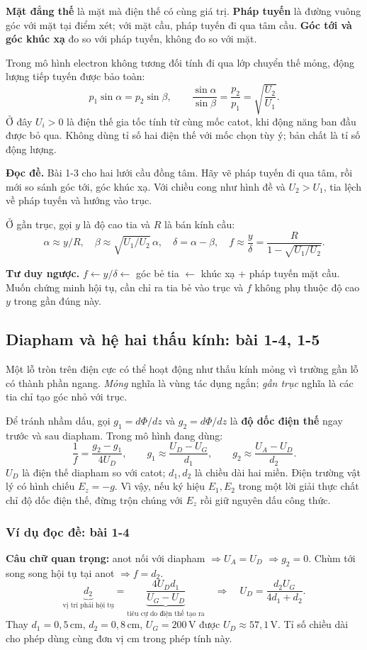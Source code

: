 \documentclass[11pt,a4paper]{article}
\newcommand{\unit}[1]{\,\mathrm{#1}}
\newcommand{\readit}[1]{\par\textbf{Đọc đề.} #1\par}
\newcommand{\think}[1]{\par\textbf{Tư duy ngược.} #1\par}
\newcommand{\ex}[1]{\subsubsection*{Ví dụ đọc đề: #1}}
\begin{document}
\textbf{Mặt đẳng thế} là mặt mà điện thế có cùng giá trị.
\textbf{Pháp tuyến} là đường vuông góc với mặt tại điểm xét;
với mặt cầu, pháp tuyến đi qua tâm cầu.
\textbf{Góc tới và góc khúc xạ} đo so với pháp tuyến, không đo so với mặt.

Trong mô hình electron không tương đối tính đi qua lớp chuyển thế mỏng,
động lượng tiếp tuyến được bảo toàn:
\[
p_1\sin\alpha=p_2\sin\beta,\qquad
\frac{\sin\alpha}{\sin\beta}=\frac{p_2}{p_1}
=\sqrt{\frac{U_2}{U_1}}.
\]
Ở đây $U_i>0$ là điện thế gia tốc tính từ cùng mốc catot,
khi động năng ban đầu được bỏ qua. Không dùng tỉ số hai điện thế
với mốc chọn tùy ý; bản chất là tỉ số động lượng.

\readit{Bài 1-3 cho hai lưới cầu đồng tâm. Hãy vẽ pháp tuyến đi qua tâm,
rồi mới so sánh góc tới, góc khúc xạ. Với chiều cong như hình đề và
$U_2>U_1$, tia lệch về pháp tuyến và hướng vào trục.}
Ở gần trục, gọi $y$ là độ cao tia và $R$ là bán kính cầu:
\[
\alpha\approx y/R,\quad
\beta\approx\sqrt{U_1/U_2}\,\alpha,\quad
\delta=\alpha-\beta,\quad
f\approx\frac y\delta=\frac R{1-\sqrt{U_1/U_2}}.
\]
\think{$f\leftarrow y/\delta\leftarrow$ góc bẻ tia
$\leftarrow$ khúc xạ + pháp tuyến mặt cầu. Muốn chứng minh hội tụ,
cần chỉ ra tia bẻ vào trục và $f$ không phụ thuộc độ cao $y$ trong gần đúng này.}

\subsection{Diapham và hệ hai thấu kính: bài 1-4, 1-5}\label{sec:diaphragm}
Một lỗ tròn trên điện cực có thể hoạt động như thấu kính mỏng vì trường
gần lỗ có thành phần ngang. \emph{Mỏng} nghĩa là vùng tác dụng ngắn;
\emph{gần trục} nghĩa là các tia chỉ tạo góc nhỏ với trục.

Để tránh nhầm dấu, gọi $g_1=d\Phi/dz$ và $g_2=d\Phi/dz$ là
\textbf{độ dốc điện thế} ngay trước và sau diapham. Trong mô hình đang dùng:
\[
\frac1f=\frac{g_2-g_1}{4U_D},\qquad
g_1\approx\frac{U_D-U_G}{d_1},\qquad
g_2\approx\frac{U_A-U_D}{d_2}.
\]
$U_D$ là điện thế diapham so với catot; $d_1,d_2$ là chiều dài hai miền.
Điện trường vật lý có hình chiếu $E_z=-g$. Vì vậy, nếu ký hiệu $E_1,E_2$
trong một lời giải thực chất chỉ độ dốc điện thế, đừng trộn chúng với
$E_z$ rồi giữ nguyên dấu công thức.

\ex{bài 1-4}
\textbf{Câu chữ quan trọng:} anot nối với diapham $\Rightarrow U_A=U_D$
$\Rightarrow g_2=0$. Chùm tới song song hội tụ tại anot
$\Rightarrow f=d_2$.
\[
\underbrace{d_2}_{\text{vị trí phải hội tụ}}
=\underbrace{\frac{4U_Dd_1}{U_G-U_D}}_{\text{tiêu cự do điện thế tạo ra}}
\quad\Rightarrow\quad
U_D=\frac{d_2U_G}{4d_1+d_2}.
\]
Thay $d_1=0{,}5\unit{cm}$, $d_2=0{,}8\unit{cm}$,
$U_G=200\unit V$ được $U_D\approx57{,}1\unit V$.
Tỉ số chiều dài cho phép dùng cùng đơn vị cm trong phép tính này.
\end{document}
